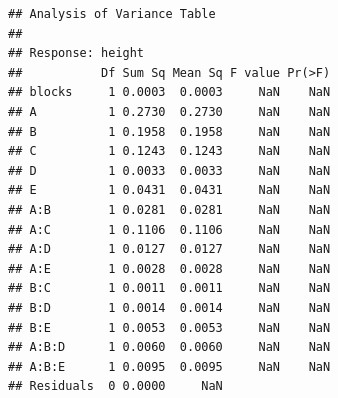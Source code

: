 \documentclass[
]{book}
\theoremstyle{definition}
\theoremstyle{definition}
\theoremstyle{definition}
\theoremstyle{definition}
\theoremstyle{remark}
\begin{document}
\begin{verbatim}
## Analysis of Variance Table
## 
## Response: height
##           Df Sum Sq Mean Sq F value Pr(>F)
## blocks     1 0.0003  0.0003     NaN    NaN
## A          1 0.2730  0.2730     NaN    NaN
## B          1 0.1958  0.1958     NaN    NaN
## C          1 0.1243  0.1243     NaN    NaN
## D          1 0.0033  0.0033     NaN    NaN
## E          1 0.0431  0.0431     NaN    NaN
## A:B        1 0.0281  0.0281     NaN    NaN
## A:C        1 0.1106  0.1106     NaN    NaN
## A:D        1 0.0127  0.0127     NaN    NaN
## A:E        1 0.0028  0.0028     NaN    NaN
## B:C        1 0.0011  0.0011     NaN    NaN
## B:D        1 0.0014  0.0014     NaN    NaN
## B:E        1 0.0053  0.0053     NaN    NaN
## A:B:D      1 0.0060  0.0060     NaN    NaN
## A:B:E      1 0.0095  0.0095     NaN    NaN
## Residuals  0 0.0000     NaN
\end{verbatim}

  
\end{document}
